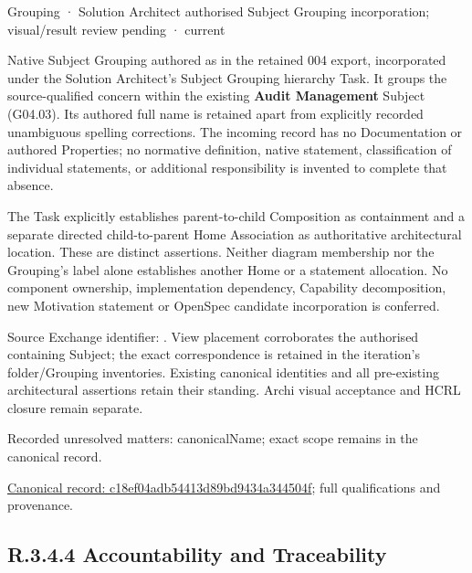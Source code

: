 \label{element:c18ef04adb54413d89bd9434a344504f}
{\small Grouping · Solution Architect authorised Subject Grouping incorporation; visual/result review pending · current}\par

Native Subject Grouping authored as \texttt{} in the retained 004 export,
incorporated under the Solution Architect's Subject Grouping hierarchy Task.
It groups the source-qualified \texttt{} concern within
the existing \textbf{Audit Management} Subject (G04.03). Its authored full name
is retained apart from explicitly recorded unambiguous spelling corrections.
The incoming record has no Documentation or authored Properties; no normative
definition, native statement, classification of individual statements, or
additional responsibility is invented to complete that absence.



The Task explicitly establishes parent-to-child Composition as containment and
a separate directed child-to-parent Home Association as authoritative architectural
location. These are distinct assertions. Neither diagram membership nor the
Grouping's label alone establishes another Home or a statement allocation.
No component ownership, implementation dependency, Capability decomposition,
new Motivation statement or OpenSpec candidate incorporation is conferred.



Source Exchange identifier: \texttt{}. View placement corroborates
the authorised containing Subject; the exact correspondence is retained in the
iteration's folder/Grouping inventories. Existing canonical identities and all
pre-existing architectural assertions retain their standing. Archi visual
acceptance and HCRL closure remain separate.


{\small Recorded unresolved matters: canonicalName; exact scope remains in the canonical record.}\par
{\footnotesize \href{../../../../continuum/grouping/c18ef04adb54413d89bd9434a344504f.md}{Canonical record: c18ef04adb54413d89bd9434a344504f}; full qualifications and provenance.}\par
\subsection*{R.3.4.4 Accountability and Traceability}
\label{navigation:R.3.4.4}

